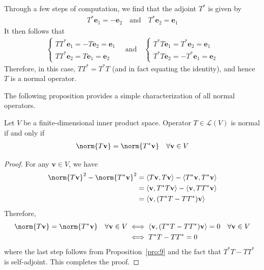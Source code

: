 \documentclass[thmcnt=section, color=blue, 12pt]{my-elegantbook}
\begin{document}
\begin{solution}
	Through a few steps of computation, we find that the adjoint $T^\ast$
	is given by
	\begin{align*}
		T^\ast \mathbf{e}_1 = -\mathbf{e}_2
		\quad \text{and} \quad 
		T^\ast \mathbf{e}_2 = \mathbf{e}_1
	\end{align*}
	It then follows that
	\begin{align*}
		\begin{cases}
			T T^\ast \mathbf{e}_1 = -T \mathbf{e}_2 = \mathbf{e}_1 \\
			T T^\ast \mathbf{e}_2 = T \mathbf{e}_1 = \mathbf{e}_2
		\end{cases}
		\quad \text{and} \quad
		\begin{cases}
			T^\ast T \mathbf{e}_1 = T^\ast \mathbf{e}_2 = \mathbf{e}_1 \\
			T^\ast T \mathbf{e}_2 = -T^\ast \mathbf{e}_1 = \mathbf{e}_2
		\end{cases}
	\end{align*}
	Therefore, in this case, $T T^\ast = T^\ast T$ 
	(and in fact equating the identity), 
	and hence $T$ is a normal operator.
\end{solution}


The following proposition provides a simple characterization
of all normal operators.

\begin{proposition} \label{pro:10}
	Let $V$ be a finite-dimensional inner product space.
	Operator $T \in \mathcal{L}(V)$ is normal
	if and only if 
	\begin{align*}
		\norm{T \mathbf{v}} = \norm{T^\ast \mathbf{v}}
		\quad \forall \mathbf{v} \in V
	\end{align*}
\end{proposition}

\begin{proof}
	For any $\mathbf{v} \in V$, we have 
	\begin{align*}
		\norm{T \mathbf{v}}^2 - \norm{T^\ast \mathbf{v}}^2
		&= \langle T \mathbf{v}, T \mathbf{v} \rangle
		- \langle T^\ast \mathbf{v}, T^\ast \mathbf{v} \rangle \\
		&= \langle \mathbf{v}, T^\ast T \mathbf{v} \rangle
		- \langle \mathbf{v}, T T^\ast \mathbf{v} \rangle \\
		&= \langle \mathbf{v}, (T^\ast T - T T^\ast) \mathbf{v} \rangle
	\end{align*}
	Therefore, 
	\begin{align*}
		\norm{T \mathbf{v}} = \norm{T^\ast \mathbf{v}}
		\quad \forall \mathbf{v} \in V
		&\iff \langle \mathbf{v}, (T^\ast T - T T^\ast) \mathbf{v} \rangle = 0
		\quad \forall \mathbf{v} \in V \\
		&\iff T^\ast T - T T^\ast = 0
	\end{align*}
	where the last step follows from Proposition~\ref{pro:9} 
	and the fact that $T^\ast T - T T^\ast$ is self-adjoint.
	This completes the proof.
\end{proof}
\end{document}
